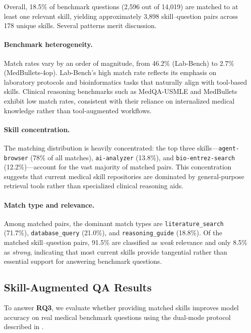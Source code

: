 Overall, 18.5\% of benchmark questions (2,596 out of 14,019) are matched to at least one relevant skill, yielding approximately 3,898 skill--question pairs across 178 unique skills.
Several patterns merit discussion.

\paragraph{Benchmark heterogeneity.}
Match rates vary by an order of magnitude, from 46.2\% (Lab-Bench) to 2.7\% (MedBullets-4op).
Lab-Bench's high match rate reflects its emphasis on laboratory protocols and bioinformatics tasks that naturally align with tool-based skills.
Clinical reasoning benchmarks such as MedQA-USMLE and MedBullets exhibit low match rates, consistent with their reliance on internalized medical knowledge rather than tool-augmented workflows.

\paragraph{Skill concentration.}
The matching distribution is heavily concentrated: the top three skills---\texttt{agent-browser} (78\% of all matches), \texttt{ai-analyzer} (13.8\%), and \texttt{bio-entrez-search} (12.2\%)---account for the vast majority of matched pairs.
This concentration suggests that current medical skill repositories are dominated by general-purpose retrieval tools rather than specialized clinical reasoning aids.

\paragraph{Match type and relevance.}
Among matched pairs, the dominant match types are \texttt{literature\_search} (71.7\%), \texttt{database\_query} (21.0\%), and \texttt{reasoning\_guide} (18.8\%).
Of the matched skill--question pairs, 91.5\% are classified as \emph{weak} relevance and only 8.5\% as \emph{strong}, indicating that most current skills provide tangential rather than essential support for answering benchmark questions.

\subsection{Skill-Augmented QA Results}
\label{ssec:ablation_results}

To answer \textbf{RQ3}, we evaluate whether providing matched skills improves model accuracy on real medical benchmark questions using the dual-mode protocol described in .

